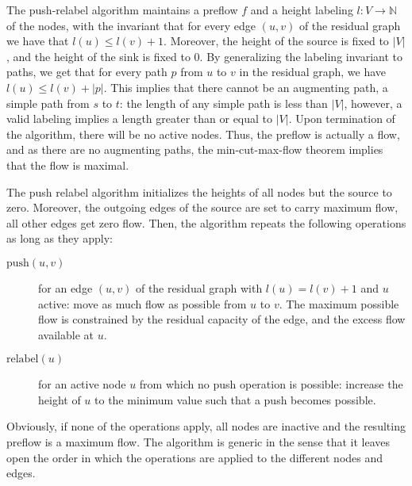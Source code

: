 \documentclass[smallcondensed]{svjour3}     %
\begin{document}
  The push-relabel algorithm maintains a preflow $f$ and a height labeling $l: V \to \mathbb {N}$ of the nodes, 
  with the invariant that for every edge $(u, v)$ of the residual graph we have that $l(u) \le l(v) + 1$. 
  Moreover, the height of the source is fixed to $\left\vert{V}\right\vert$, and the height of the sink is fixed to $0$.
  By generalizing the labeling invariant to paths, we get that for every path $p$ from $u$ to $v$ in the residual graph, we have $l(u) \le l(v) + |p|$.
  This implies that there cannot be an augmenting path, \ie a simple path from $s$ to $t$: the length of any simple path is less than $|V|$, however, a valid labeling 
  implies a length greater than or equal to $|V|$. Upon termination of the algorithm, there will be no active nodes. 
  Thus, the preflow is actually a flow, and as there are no augmenting paths, the min-cut-max-flow theorem implies that the flow is maximal.
  
  The push relabel algorithm initializes the heights of all nodes but the source to zero. Moreover, the outgoing edges of the source are 
  set to carry maximum flow, all other edges get zero flow. Then, the algorithm repeats the following operations as long as they apply:
  \begin{description}
    \item[$\textrm{push}(u,v)$] for an edge $(u,v)$ of the residual graph with $l(u) = l(v)+1$ and $u$ active: move as much flow as possible from $u$ to $v$.
    The maximum possible flow is constrained by the residual capacity of the edge, and the excess flow available at $u$.
    \item[$\textrm{relabel}(u)$] for an active node $u$ from which no push operation is possible: increase the height of $u$ to the minimum value such that a push
      becomes possible.
  \end{description}
  Obviously, if none of the operations apply, all nodes are inactive and the resulting preflow is a maximum flow.
  The algorithm is generic in the sense that it leaves open the order in which the operations are applied to the different nodes and edges.
  
\end{document}

